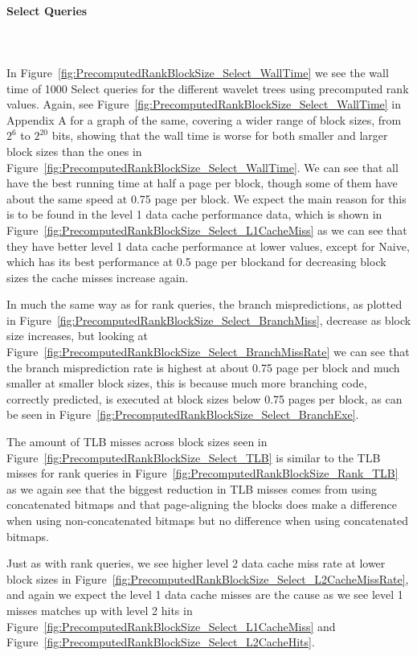 \paragraph{Select Queries}~\\\\
In Figure~\ref{fig:PrecomputedRankBlockSize_Select_WallTime} we see the wall time of 1000 Select queries for the different wavelet trees using precomputed rank values.
Again, see Figure~\ref{fig:PrecomputedRankBlockSize_Select_WallTime} in Appendix A for a graph of the same, covering a wider range of block sizes, from $2^{6}$ to $2^{20}$ bits, showing that the wall time is worse for both smaller and larger block sizes than the ones in Figure~\ref{fig:PrecomputedRankBlockSize_Select_WallTime}.
We can see that all have the best running time at half a page per block, though some of them have about the same speed at 0.75 page per block.
We expect the main reason for this is to be found in the level 1 data cache performance data, which is shown in Figure~\ref{fig:PrecomputedRankBlockSize_Select_L1CacheMiss} as we can see that they have better level 1 data cache performance at lower values, except for Naive, which has its best performance at 0.5 page per blockand for decreasing block sizes the cache misses increase again.

In much the same way as for rank queries, the branch mispredictions, as plotted in Figure~\ref{fig:PrecomputedRankBlockSize_Select_BranchMiss}, decrease as block size increases, but looking at Figure~\ref{fig:PrecomputedRankBlockSize_Select_BranchMissRate} we can see that the branch misprediction rate is highest at about 0.75 page per block and much smaller at smaller block sizes, this is because much more branching code, correctly predicted, is executed at block sizes below 0.75 pages per block, as can be seen in Figure~\ref{fig:PrecomputedRankBlockSize_Select_BranchExe}.

The amount of TLB misses across block sizes seen in Figure~\ref{fig:PrecomputedRankBlockSize_Select_TLB} is similar to the TLB misses for rank queries in Figure~\ref{fig:PrecomputedRankBlockSize_Rank_TLB} as we again see that the biggest reduction in TLB misses comes from using concatenated bitmaps and that page-aligning the blocks does make a difference when using non-concatenated bitmaps but no difference when using concatenated bitmaps.

Just as with rank queries, we see higher level 2 data cache miss rate at lower block sizes in Figure~\ref{fig:PrecomputedRankBlockSize_Select_L2CacheMissRate}, and again we expect the level 1 data cache misses are the cause as we see level 1 misses matches up with level 2 hits in Figure~\ref{fig:PrecomputedRankBlockSize_Select_L1CacheMiss} and Figure~\ref{fig:PrecomputedRankBlockSize_Select_L2CacheHits}.

